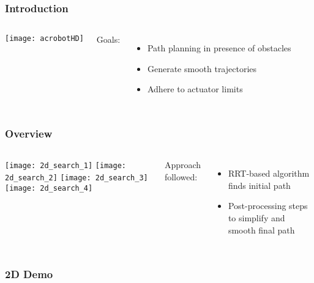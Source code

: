\begin{frame}
	\frametitle{Introduction}

	\begin{columns}
			\begin{center}
				\texttt{[image: acrobotHD]}
			\end{center}


			Goals:

			\begin{itemize}

				\item
					Path planning in presence of obstacles

				\item
					Generate smooth trajectories

				\item
					Adhere to actuator limits

			\end{itemize}
	\end{columns}
\end{frame}

\begin{frame}
	\frametitle{Overview}

	\begin{columns}
		\column{0.75\textwidth}
			\begin{minipage}{\textwidth}
				\texttt{[image: 2d\_search\_1]}%
				\texttt{[image: 2d\_search\_2]}
				\texttt{[image: 2d\_search\_3]}%
				\texttt{[image: 2d\_search\_4]}
			\end{minipage}

		\column{0.25\textwidth}

			Approach followed:

			\begin{itemize}

				\item

					RRT-based algorithm finds initial path

				\item

					Post-processing steps to simplify and smooth final path

			\end{itemize}

	\end{columns}

\end{frame}

\begin{frame}
	\frametitle{2D Demo}

\end{frame}
